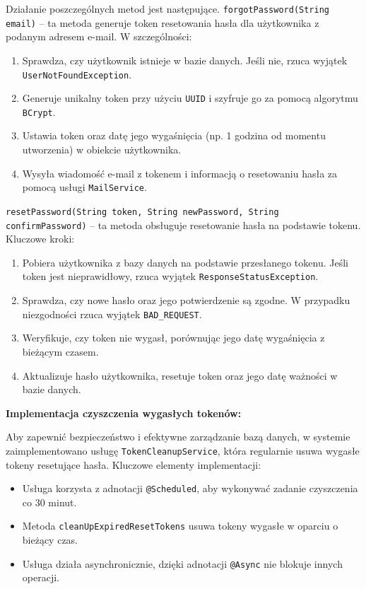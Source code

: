 Działanie poszczególnych metod jest następujące.\newline
\texttt{forgotPassword(String email)} -- ta metoda generuje token resetowania hasła dla użytkownika z podanym adresem e-mail. W szczególności:
    \begin{enumerate}
        \item Sprawdza, czy użytkownik istnieje w bazie danych. Jeśli nie, rzuca wyjątek \texttt{UserNotFoundException}.
        \item Generuje unikalny token przy użyciu \texttt{UUID} i szyfruje go za pomocą algorytmu \texttt{BCrypt}.
        \item Ustawia token oraz datę jego wygaśnięcia (np. 1 godzina od momentu utworzenia) w obiekcie użytkownika.
        \item Wysyła wiadomość e-mail z tokenem i informacją o resetowaniu hasła za pomocą usługi \texttt{MailService}.
    \end{enumerate}
 \texttt{resetPassword(String token, String newPassword, String confirmPassword)} -- ta metoda obsługuje resetowanie hasła na podstawie tokenu. Kluczowe kroki:
    \begin{enumerate}
        \item Pobiera użytkownika z bazy danych na podstawie przesłanego tokenu. Jeśli token jest nieprawidłowy, rzuca wyjątek \texttt{ResponseStatusException}.
        \item Sprawdza, czy nowe hasło oraz jego potwierdzenie są zgodne. W przypadku niezgodności rzuca wyjątek \texttt{BAD\_REQUEST}.
        \item Weryfikuje, czy token nie wygasł, porównując jego datę wygaśnięcia z bieżącym czasem.
        \item Aktualizuje hasło użytkownika, resetuje token oraz jego datę ważności w bazie danych.
    \end{enumerate}


\textbf{Implementacja czyszczenia wygasłych tokenów:}

Aby zapewnić bezpieczeństwo i efektywne zarządzanie bazą danych, w systemie zaimplementowano usługę \texttt{TokenCleanupService}, która regularnie usuwa wygasłe tokeny resetujące hasła. Kluczowe elementy implementacji:
\begin{itemize}
    \item Usługa korzysta z adnotacji \texttt{@Scheduled}, aby wykonywać zadanie czyszczenia co 30 minut.
    \item Metoda \texttt{cleanUpExpiredResetTokens} usuwa tokeny wygasłe w oparciu o bieżący czas.
    \item Usługa działa asynchronicznie, dzięki adnotacji \texttt{@Async} nie blokuje innych operacji.
\end{itemize}

